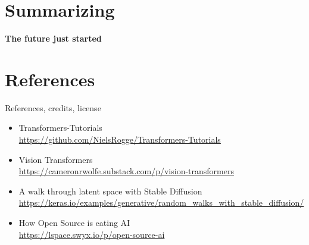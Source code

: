\documentclass[17pt,aspectratio=169,hyperref={pdfusetitle,colorlinks,allcolors=olive}]{beamer}
\begin{document}



  


\section{Summarizing}

\begin{frame}[fragile]

  {\Large \bf
    The future just started
  }
\end{frame}


\section*{References}

\begin{frame}[fragile]

  {\huge References, credits, license}
\end{frame}

\begin{frame}[fragile]

  {\small
    \begin{itemize}
    \item Transformers-Tutorials \\
      {\scriptsize \url{https://github.com/NielsRogge/Transformers-Tutorials}}
    \item Vision Transformers \\
      {\scriptsize \url{https://cameronrwolfe.substack.com/p/vision-transformers}}
    \item A walk through latent space with Stable Diffusion \\
      {\scriptsize \url{https://keras.io/examples/generative/random_walks_with_stable_diffusion/}}
    \item How Open Source is eating AI \\
      {\scriptsize \url{https://lspace.swyx.io/p/open-source-ai}}
    \end{itemize}
  }  
\end{frame}
\end{document}
